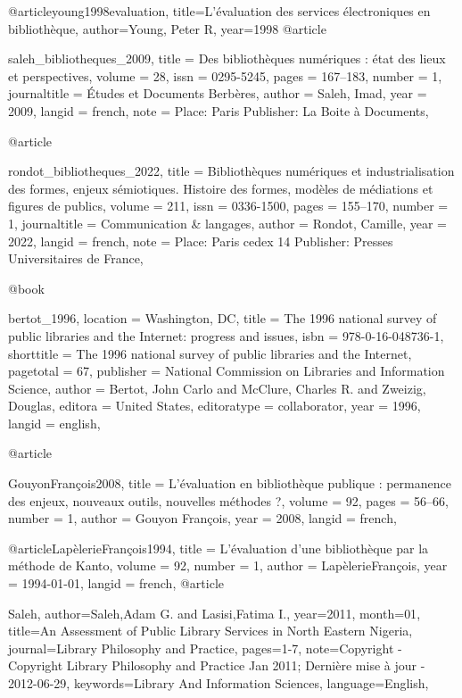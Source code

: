 @article{young1998evaluation,
  title={L'{\'e}valuation des services {\'e}lectroniques en biblioth{\`e}que},
  author={Young, Peter R},
  year={1998}
}
@article{saleh_bibliotheques_2009,
	title = {Des bibliothèques numériques : état des lieux et perspectives},
	volume = {28},
	issn = {0295-5245},
	pages = {167--183},
	number = {1},
	journaltitle = {Études et Documents Berbères},
	author = {Saleh, Imad},
	year = {2009},
	langid = {french},
	note = {Place: Paris
Publisher: La Boite à Documents},
	
}
@article{rondot_bibliotheques_2022,
	title = {Bibliothèques numériques et industrialisation des formes, enjeux sémiotiques. Histoire des formes, modèles de médiations et figures de publics},
	volume = {211},
	issn = {0336-1500},
	pages = {155--170},
	number = {1},
	journaltitle = {Communication \& langages},
	author = {Rondot, Camille},
	year = {2022},
	langid = {french},
	note = {Place: Paris cedex 14
Publisher: Presses Universitaires de France},
	
	}
@book{bertot_1996,
	location = {Washington, {DC}},
	title = {The 1996 national survey of public libraries and the Internet: progress and issues},
	isbn = {978-0-16-048736-1},
	shorttitle = {The 1996 national survey of public libraries and the Internet},
	pagetotal = {67},
	publisher = {National Commission on Libraries and Information Science},
	author = {Bertot, John Carlo and {McClure}, Charles R. and Zweizig, Douglas},
	editora = {United States},
	editoratype = {collaborator},
	year = {1996},
	langid = {english},

}
@article{GouyonFrançois2008,
	title = {L’évaluation en bibliothèque publique : permanence des enjeux, nouveaux outils, nouvelles méthodes ?},
	volume = {92},
	pages = {56--66},
	number = {1},
	author = {Gouyon François},
	year = {2008},
	langid = {french},
	
	}

@article{LapèlerieFrançois1994,
	title = {L'évaluation d'une bibliothèque par la méthode de Kanto},
	volume = {92},
	number = {1},
	author = {LapèlerieFrançois},
	year = {1994-01-01},
	langid = {french},		
	}
	@article{Saleh,
author={Saleh,Adam G. and Lasisi,Fatima I.},
year={2011},
month={01},
title={An Assessment of Public Library Services in North Eastern Nigeria},
journal={Library Philosophy and Practice},
pages={1-7},
note={Copyright - Copyright Library Philosophy and Practice Jan 2011; Dernière mise à jour - 2012-06-29},
keywords={Library And Information Sciences},
language={English},

}